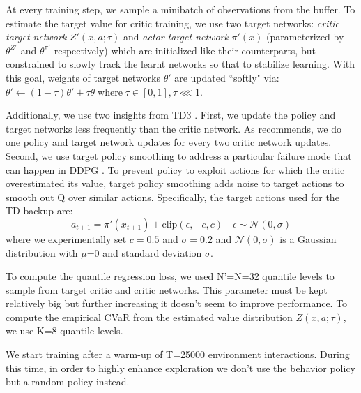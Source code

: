 At every training step, we sample a minibatch of observations from the buffer.
To estimate the target value for critic training, we use two target networks:  \textit{critic target network} $Z'(x,a;\tau)$ and \textit{actor target network}
$\pi'(x)$ (parameterized by $\theta^{Z'}$ and $\theta^{\pi'}$ respectively) which are initialized
like their counterparts, but constrained to slowly track the learnt networks so that to stabilize learning.
With this goal, weights of target networks $\theta'$ are updated ``softly" via:
$\theta' \leftarrow (1-\tau)\theta' + \tau\theta \; \text{where} \; \tau \in [0,1], \tau \lll 1$.

Additionally, we use two insights from TD3 \citet{Fujimoto2018}.
First, we update the policy and target networks less frequently than the critic network. As 
\citet{Fujimoto2018} recommends, we do one policy and target network updates for every 
two critic network updates. \\
Second, we use target policy smoothing to address a particular failure mode that can happen
in DDPG \citep{Lillicrap2016}. To prevent policy to exploit 
actions for which the critic overestimated its value, target policy smoothing adds noise to target actions
to smooth out Q over similar actions. Specifically, the target actions used for the TD backup are:
\begin{equation}
    a_{t+1}=\pi'(x_{t+1}) + \text{clip}(\epsilon, -c, c) \quad \epsilon \sim \mathcal{N}(0,\sigma)
\end{equation}
where we experimentally set $c=0.5$ and $\sigma=0.2$ and $\mathcal{N}(0,\sigma)$ is a
Gaussian distribution with $\mu$=0 and standard deviation $\sigma$.

To compute the quantile regression loss, we used N'=N=32 quantile levels to sample from
target critic and critic networks. This parameter must be kept relatively big but further increasing
it doesn't seem to improve performance.
To compute the empirical CVaR from the estimated value distribution 
$Z(x,a; \tau)$, we use K=8 quantile levels.

We start training after a warm-up of T=25000 environment interactions. During this time, in order
to highly enhance exploration we don't use the behavior policy but a random policy instead.

